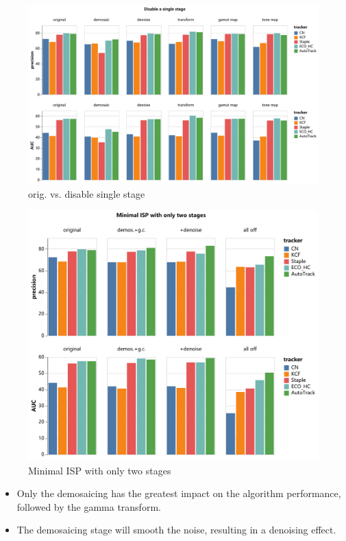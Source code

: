 \documentclass{beamer}
\begin{document}
\begin{frame}
    \begin{figure}[htpb]
        \begin{center}
            \includegraphics[width=0.8\linewidth]{fig/dis.pdf}
            \caption{orig. vs. disable single stage}
        \end{center}
    \end{figure}
\end{frame}

\begin{frame}
    \begin{figure}[htpb]
        \begin{center}
            \includegraphics[width=0.7\linewidth]{fig/mini.pdf}
            \caption{Minimal ISP with only two stages}
        \end{center}
    \end{figure}
\end{frame}

\begin{frame}
    \begin{itemize}[<+-| alert@+>]
        \item Only the demosaicing has the greatest impact on the algorithm performance, followed by the gamma transform.
        \item The demosaicing stage will smooth the noise, resulting in a denoising effect.
    \end{itemize}
\end{frame}
\end{document}
